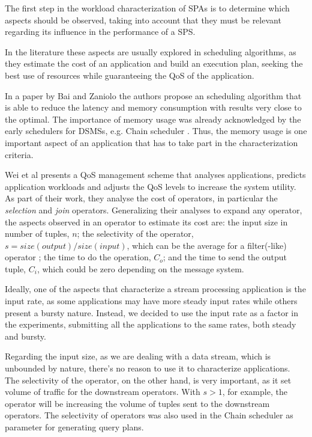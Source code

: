 \documentclass[ppgc,diss,english]{iiufrgs}
\begin{document}

The first step in the workload characterization of SPAs is to determine which aspects should be observed, taking into account that they must be relevant regarding its influence in the performance of a SPS.

In the literature these aspects are usually explored in scheduling algorithms, as they estimate the cost of an application and build an execution plan, seeking the best use of resources while guaranteeing the QoS of the application.

In a paper by Bai and Zaniolo \cite{bai2008minimizing} the authors propose an scheduling algorithm that is able to reduce the latency and memory consumption with results very close to the optimal. The importance of memory usage was already acknowledged by the early schedulers for DSMSs, e.g. Chain scheduler \cite{babcock2003chain}. Thus, the memory usage is one important aspect of an application that has to take part in the characterization criteria.

Wei et al \cite{wei2006prediction} presents a QoS management scheme that analyses applications, predicts application workloads and adjusts the QoS levels to increase the system utility. As part of their work, they analyse the cost of operators, in particular the \emph{selection} and \emph{join} operators. Generalizing their analyses to expand any operator, the aspects observed in an operator to estimate its cost are: the input size in number of tuples, $n$; the selectivity of the operator, $s = size(output)/size(input)$, which can be the average for a filter(-like) operator \cite{babcock2004operator}; the time to do the operation, $C_{o}$; and the time to send the output tuple, $C_{i}$, which could be zero depending on the message system.

Ideally, one of the aspects that characterize a stream processing application is the input rate, as some applications may have more steady input rates while others present a bursty nature. Instead, we decided to use the input rate as a factor in the experiments, submitting all the applications to the same rates, both steady and bursty.

Regarding the input size, as we are dealing with a data stream, which is unbounded by nature, there's no reason to use it to characterize applications. The selectivity of the operator, on the other hand, is very important, as it set volume of traffic for the downstream operators. With $s > 1$, for example, the operator will be increasing the volume of tuples sent to the downstream operators. The selectivity of operators was also used in the Chain scheduler \cite{babcock2003chain} as parameter for generating query plans.
\end{document}
